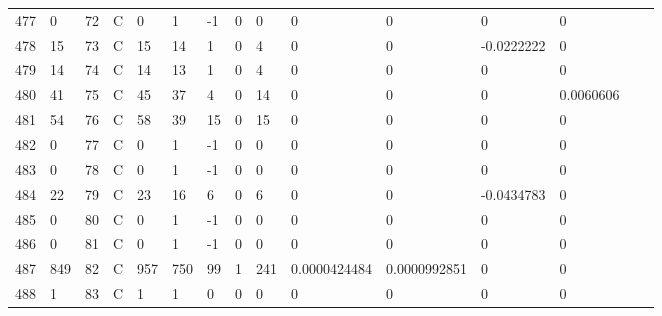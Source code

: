 \begin{longtable}{lllllllllllllll}
	477 & 0                 & 72  & C   & 0                 & 1                 & -1                & 0    & 0          & 0              & 0              & 0             & 0            \\
	478 & 15                & 73  & C   & 15                & 14                & 1                 & 0    & 4          & 0              & 0              & -0.0222222    & 0            \\
	479 & 14                & 74  & C   & 14                & 13                & 1                 & 0    & 4          & 0              & 0              & 0             & 0            \\
	480 & 41                & 75  & C   & 45                & 37                & 4                 & 0    & 14         & 0              & 0              & 0             & 0.0060606    \\
	481 & 54                & 76  & C   & 58                & 39                & 15                & 0    & 15         & 0              & 0              & 0             & 0            \\
	482 & 0                 & 77  & C   & 0                 & 1                 & -1                & 0    & 0          & 0              & 0              & 0             & 0            \\
	483 & 0                 & 78  & C   & 0                 & 1                 & -1                & 0    & 0          & 0              & 0              & 0             & 0            \\
	484 & 22                & 79  & C   & 23                & 16                & 6                 & 0    & 6          & 0              & 0              & -0.0434783    & 0            \\
	485 & 0                 & 80  & C   & 0                 & 1                 & -1                & 0    & 0          & 0              & 0              & 0             & 0            \\
	486 & 0                 & 81  & C   & 0                 & 1                 & -1                & 0    & 0          & 0              & 0              & 0             & 0            \\
	487 & 849               & 82  & C   & 957               & 750               & 99                & 1    & 241        & 0.0000424484   & 0.0000992851   & 0             & 0            \\
	488 & 1                 & 83  & C   & 1                 & 1                 & 0                 & 0    & 0          & 0              & 0              & 0             & 0            \\

\end{longtable}
